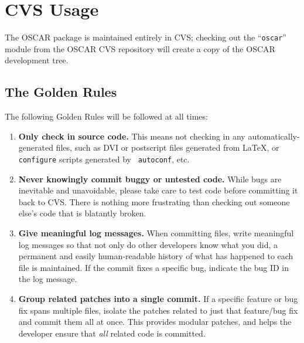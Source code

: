 %
%
%

\section{CVS Usage}
\label{sec:cvs}

The OSCAR package is maintained entirely in CVS; checking out the
``{\tt oscar}'' module from the OSCAR CVS repository will create a
copy of the OSCAR development tree.


\subsection{The Golden Rules}

The following Golden Rules will be followed at all times:

\begin{enumerate}
\item {\bf Only check in source code.}  This means not checking in any
  automatically-generated files, such as DVI or postscript files
  generated from \LaTeX, or {\tt configure} scripts generated by {\tt
    autoconf}, etc.
  
\item {\bf Never knowingly commit buggy or untested code.}  While bugs
  are inevitable and unavoidable, please take care to test code before
  committing it back to CVS.  There is nothing more frustrating than
  checking out someone else's code that is blatantly broken.
  
\item {\bf Give meaningful log messages.}  When committing files,
  write meaningful log messages so that not only do other developers
  know what you did, a permanent and easily human-readable history of
  what has happened to each file is maintained.  If the commit fixes a
  specific bug, indicate the bug ID in the log message.
  
\item {\bf Group related patches into a single commit.}  If a specific
  feature or bug fix spans multiple files, isolate the patches related
  to just that feature/bug fix and commit them all at once.  This
  provides modular patches, and helps the developer ensure that {\em
    all} related code is committed.
\end{enumerate}

